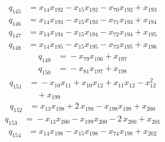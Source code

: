 \begin{align*}
q_{145} &={}x_{14}x_{192} -x_{15}x_{192} -x_{70}x_{192} +x_{193}
\end{align*}
\begin{align*}
q_{146} &={}x_{14}x_{193} -x_{15}x_{193} -x_{71}x_{193} +x_{194}
\end{align*}
\begin{align*}
q_{147} &={}x_{14}x_{194} -x_{15}x_{194} -x_{72}x_{194} +x_{195}
\end{align*}
\begin{align*}
q_{148} &={}x_{14}x_{195} -x_{15}x_{195} -x_{73}x_{195} +x_{196}
\end{align*}
\begin{align*}
q_{149} &={}-x_{79}x_{196} +x_{197}
\end{align*}
\begin{align*}
q_{150} &={}-x_{81}x_{197} +x_{198}
\end{align*}
\begin{align*}
q_{151} &={}-x_{10}x_{11} +x_{10}x_{12} +x_{11}x_{12} -x_{12}^{2}\\
&\quad +x_{199}
\end{align*}
\begin{align*}
q_{152} &={}x_{13}x_{198} +2\,x_{198} -x_{198}x_{199} +x_{200}
\end{align*}
\begin{align*}
q_{153} &={}-x_{13}x_{200} -x_{199}x_{200} -2\,x_{200} +x_{201}
\end{align*}
\begin{align*}
q_{154} &={}x_{14}x_{198} -x_{15}x_{198} -x_{74}x_{198} +x_{202}
\end{align*}
\endgroup
